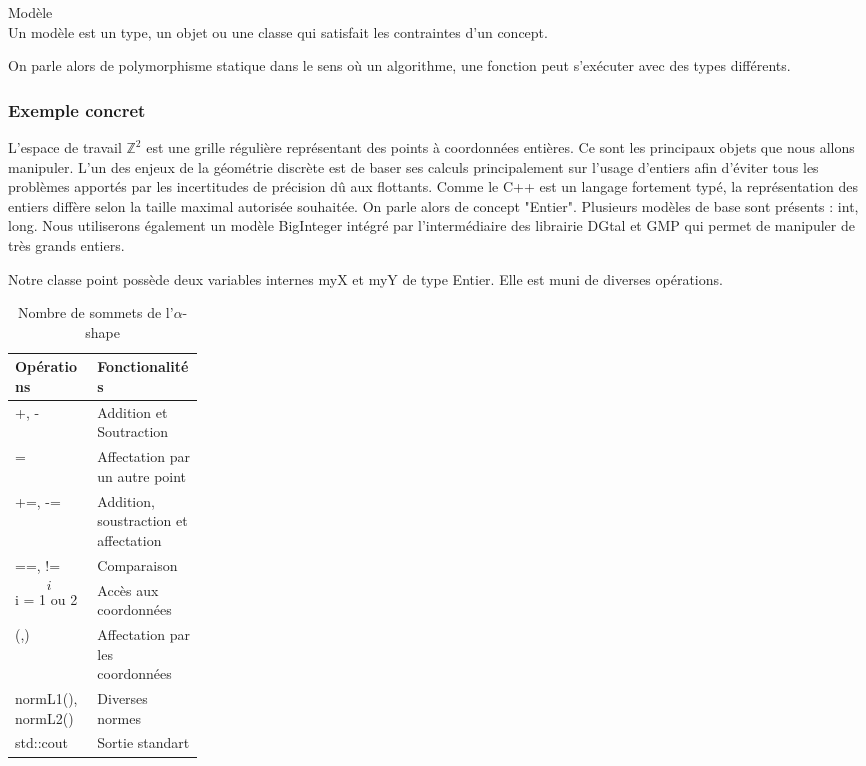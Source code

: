 \begin{Definition}{Modèle}\\
  Un modèle est un type, un objet ou une classe qui satisfait les contraintes d'un concept.
\label{def:cpp-mod}

\end{Definition}

On parle alors de polymorphisme statique dans le sens où un algorithme, une fonction peut s'exécuter avec des types différents.

\subsubsection{Exemple concret}

L'espace de travail $\mathbb{Z}^{2}$ est une grille régulière représentant des points à coordonnées entières. Ce sont les principaux objets que nous allons manipuler. L'un des enjeux de la géométrie discrète est de baser ses calculs principalement sur l'usage d'entiers afin d'éviter tous les problèmes apportés par les incertitudes de précision dû aux flottants. Comme le C++ est un langage fortement typé, la représentation des entiers diffère selon la taille maximal autorisée souhaitée. On parle alors de concept "Entier". Plusieurs modèles de base sont présents : int, long. Nous utiliserons également un modèle BigInteger intégré par l'intermédiaire des librairie DGtal et GMP qui permet de manipuler de très grands entiers.


Notre classe point possède deux variables internes myX et myY de type Entier. Elle est muni de diverses opérations.

\begin{table}[H]
  \begin{tabular}{|p{0.09\linewidth}|p{0.13\linewidth}|}
    \hline
     Opérations & Fonctionalités\\ 
    \hline
    +, -               & Addition et Soutraction\\
    =                  & Affectation par un autre point\\
    +=, -=             & Addition, soustraction et affectation\\
    ==, !=             & Comparaison\\
    \[i\] i = 1 ou 2     & Accès aux coordonnées\\
    (,)                & Affectation par les coordonnées\\
    normL1(), normL2() & Diverses normes\\
    std::cout          & Sortie standart\\
    \hline
  \end{tabular} 
  \caption{Nombre de sommets de l'$\alpha$-shape}
\end{table}

